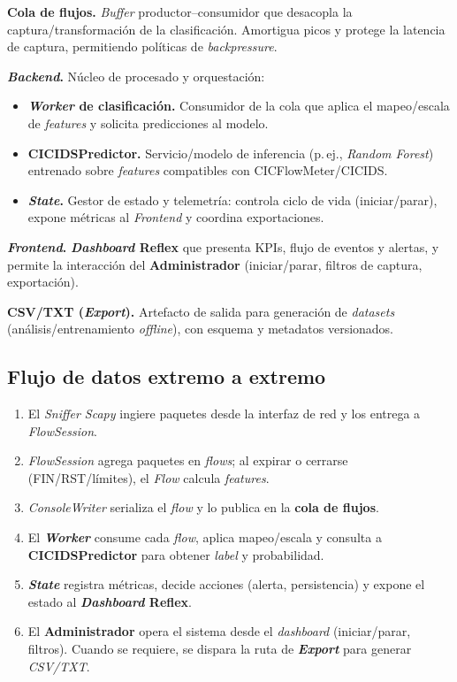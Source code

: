 \noindent\textbf{Cola de flujos.} \emph{Buffer} productor–consumidor que desacopla la captura/transformación de la clasificación. Amortigua picos y protege la latencia de captura, permitiendo políticas de \emph{backpressure}.

\noindent\textbf{\textit{Backend}.} Núcleo de procesado y orquestación:
\begin{itemize}
  \item \textbf{\textit{Worker} de clasificación.} Consumidor de la cola que aplica el mapeo/escala de \emph{features} y solicita predicciones al modelo.
  \item \textbf{CICIDSPredictor.} Servicio/modelo de inferencia (p.\,ej., \textit{Random Forest}) entrenado sobre \emph{features} compatibles con CICFlowMeter/CICIDS.
  \item \textbf{\textit{State}.} Gestor de estado y telemetría: controla ciclo de vida (iniciar/parar), expone métricas al \textit{Frontend} y coordina exportaciones.
\end{itemize}

\noindent\textbf{\textit{Frontend}.} \textbf{\textit{Dashboard} Reflex} que presenta KPIs, flujo de eventos y alertas, y permite la interacción del \textbf{Administrador} (iniciar/parar, filtros de captura, exportación).

\noindent\textbf{CSV/TXT (\textit{Export}).} Artefacto de salida para generación de \textit{datasets} (análisis/entrenamiento \textit{offline}), con esquema y metadatos versionados.

\subsection*{Flujo de datos extremo a extremo}

\begin{enumerate}
  \item El \emph{Sniffer Scapy} ingiere paquetes desde la interfaz de red y los entrega a \emph{FlowSession}.
  \item \emph{FlowSession} agrega paquetes en \emph{flows}; al expirar o cerrarse (FIN/RST/límites), el \emph{Flow} calcula \emph{features}.
  \item \emph{ConsoleWriter} serializa el \emph{flow} y lo publica en la \textbf{cola de flujos}.
  \item El \textbf{\textit{Worker}} consume cada \emph{flow}, aplica mapeo/escala y consulta a \textbf{CICIDSPredictor} para obtener \emph{label} y probabilidad.
  \item \textbf{\textit{State}} registra métricas, decide acciones (alerta, persistencia) y expone el estado al \textbf{\textit{Dashboard} Reflex}.
  \item El \textbf{Administrador} opera el sistema desde el \emph{dashboard} (iniciar/parar, filtros). Cuando se requiere, se dispara la ruta de \textbf{\textit{Export}} para generar \emph{CSV/TXT}.
\end{enumerate}

